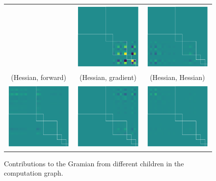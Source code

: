 \begin{figure}
\begin{tabular}{ccc}
    &
      \includegraphics[width=0.22\linewidth]{../kfac_pinns_exp/exp04_gramian_contributions/fig/gram_grad_input_grad_input.png}
    &
      \includegraphics[width=0.22\linewidth]{../kfac_pinns_exp/exp04_gramian_contributions/fig/gram_grad_input_hess_input.png}
    \\
    (Hessian, forward)
    &
      (Hessian, gradient)
    &
      (Hessian, Hessian)
    \\
    \includegraphics[width=0.22\linewidth]{../kfac_pinns_exp/exp04_gramian_contributions/fig/gram_hess_input_output.png}
    &
      \includegraphics[width=0.22\linewidth]{../kfac_pinns_exp/exp04_gramian_contributions/fig/gram_hess_input_grad_input.png}
    &
      \includegraphics[width=0.22\linewidth]{../kfac_pinns_exp/exp04_gramian_contributions/fig/gram_hess_input_hess_input.png}
  \end{tabular}
  \caption{Contributions to the Gramian from different children in the
    computation graph.}\label{fig:gramian-contribution-children}
\end{figure}
